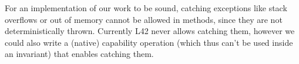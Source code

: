 

For an implementation of our work to be sound, catching exceptions like stack overflows or out of memory
cannot be allowed in \Q@invariant@ methods, since they are not deterministically thrown.
Currently L42 never allows catching them, however we could also write a (native) capability operation (which thus can't be used inside an invariant) that enables catching them.



